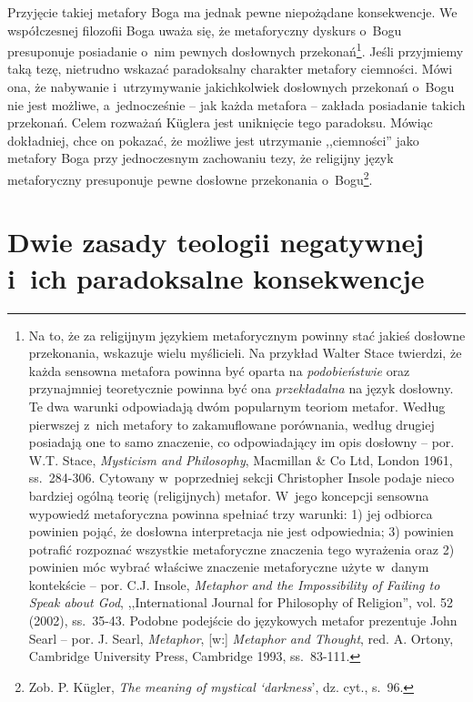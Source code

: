 Przyjęcie takiej metafory Boga ma jednak pewne niepożądane konsekwencje. We współczesnej filozofii Boga uważa się, że metaforyczny dyskurs o~Bogu presuponuje posiadanie o~nim pewnych dosłownych przekonań\footnote{Na to, że za religijnym językiem metaforycznym powinny stać jakieś dosłowne przekonania, wskazuje wielu myślicieli. Na przykład Walter Stace twierdzi, że każda sensowna metafora powinna być oparta na \textit{podobieństwie} oraz przynajmniej teoretycznie powinna być ona \textit{przekładalna} na język dosłowny. Te dwa warunki odpowiadają dwóm popularnym teoriom metafor. Według pierwszej z~nich metafory to zakamuflowane porównania, według drugiej posiadają one to samo znaczenie, co odpowiadający im opis dosłowny -- por. W.T. Stace, \textit{Mysticism and Philosophy}, Macmillan \& Co Ltd, London 1961, ss.~284-306. Cytowany w~poprzedniej sekcji Christopher Insole podaje nieco bardziej ogólną teorię (religijnych) metafor. W~jego koncepcji sensowna wypowiedź metaforyczna powinna spełniać trzy warunki: 1) jej odbiorca powinien pojąć, że dosłowna interpretacja nie jest odpowiednia; 3) powinien potrafić rozpoznać wszystkie metaforyczne znaczenia tego wyrażenia oraz 2) powinien móc wybrać właściwe znaczenie metaforyczne użyte w~danym kontekście -- por. C.J. Insole, \textit{Metaphor and the Impossibility of Failing to Speak about God}, ,,International Journal for Philosophy of Religion'', vol. 52 (2002), ss.~35-43. Podobne podejście do językowych metafor prezentuje John Searl -- por. J. Searl, \textit{Metaphor}, [w:] \textit{Metaphor and Thought}, red. A. Ortony, Cambridge University Press, Cambridge 1993, ss.~83-111.}. Jeśli przyjmiemy taką tezę, nietrudno wskazać paradoksalny charakter metafory ciemności. Mówi ona, że nabywanie i~utrzymywanie jakichkolwiek dosłownych przekonań o~Bogu nie jest możliwe, a~jednocześnie -- jak każda metafora -- zakłada posiadanie takich przekonań. Celem rozważań Küglera jest uniknięcie tego paradoksu. Mówiąc dokładniej, chce on pokazać, że możliwe jest utrzymanie ,,ciemności'' jako metafory Boga przy jednoczesnym zachowaniu tezy, że religijny język metaforyczny presuponuje pewne dosłowne przekonania o~Bogu\footnote{Zob. P. Kügler, \textit{The meaning of mystical ‘darkness}', dz. cyt., s.~96.}.


\section{Dwie zasady teologii negatywnej i~ich paradoksalne konsekwencje}\label{sil-kug-zasady}

